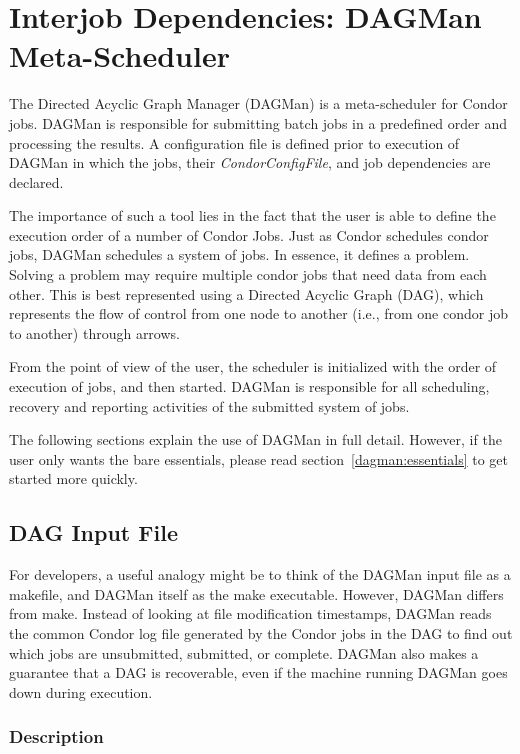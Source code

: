 \section{\label{sec:DAGMan}Interjob Dependencies: DAGMan Meta-Scheduler}

The Directed Acyclic Graph Manager (DAGMan) is a meta-scheduler for Condor
jobs.  DAGMan is responsible for submitting batch jobs in a predefined order
and processing the results. A configuration file is defined prior to execution
of DAGMan in which the jobs, their \textit{CondorConfigFile}, and job
dependencies are declared.

The importance of such a tool lies in the fact that the user is able to define
the execution order of a number of Condor Jobs. Just as Condor schedules
condor jobs, DAGMan schedules a system of jobs. In essence, it defines a
problem. Solving a problem may require multiple condor jobs that need data
from each other. This is best represented using a Directed Acyclic Graph
(DAG), which represents the flow of control from one node to another (i.e.,
from one condor job to another) through arrows.

From the point of view of the user, the scheduler is initialized with the
order of execution of jobs, and then started. DAGMan is responsible for all
scheduling, recovery and reporting activities of the submitted system of jobs.

The following sections explain the use of DAGMan in full detail.  However, if
the user only wants the bare essentials, please read
section~\ref{dagman:essentials} to get started more quickly.

\subsection{DAG Input File}

For developers, a useful analogy might be to think of the DAGMan input file as
a makefile, and DAGMan itself as the make executable.  However, DAGMan differs
from make.  Instead of looking at file modification timestamps, DAGMan reads
the common Condor log file generated by the Condor jobs in the DAG to find out
which jobs are unsubmitted, submitted, or complete.  DAGMan also makes a
guarantee that a DAG is recoverable, even if the machine running DAGMan goes
down during execution.

\subsubsection{\label{dagman:dagdesc}Description}

